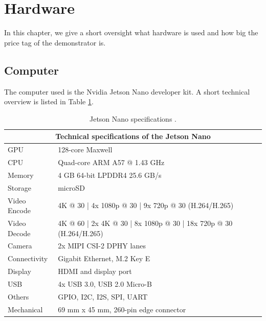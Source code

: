 \section{Hardware}
In this chapter, we give a short oversight what hardware is used and how big the price tag of the demonstrator is. 

\subsection{Computer}
The computer used is the Nvidia Jetson Nano developer kit.
A short technical overview is listed in Table \ref{development:nano}.
\begin{table}[ht]
	\begin{tabular}{|l|l|}
		\hline
		\multicolumn{2}{|c|}{Technical specifications of the Jetson Nano} \\
		\hline
		GPU			& 	128-core Maxwell\\
		CPU			& 	Quad-core ARM A57 @ 1.43 GHz \\
		Memory 		&	4 GB 64-bit LPDDR4 25.6 GB/s 				\\
		Storage		&	microSD				\\
		Video Encode&	4K @ 30 | 4x 1080p @ 30 | 9x 720p @ 30 (H.264/H.265) \\
		Video Decode&	4K @ 60 | 2x 4K @ 30 | 8x 1080p @ 30 | 18x 720p @ 30 (H.264/H.265) \\
		Camera 		&	2x MIPI CSI-2 DPHY lanes \\
		Connectivity&	Gigabit Ethernet, M.2 Key E\\
		Display 	&	HDMI and display port \\
		USB 		&	4x USB 3.0, USB 2.0 Micro-B\\
		Others 		&	GPIO, I2C, I2S, SPI, UART \\
		Mechanical 	&	69 mm x 45 mm, 260-pin edge connector \\		
		\hline
	\end{tabular}
	\caption{Jetson Nano specifications \cite{jetson}.\label{development:nano}}
\end{table}

\newpage


